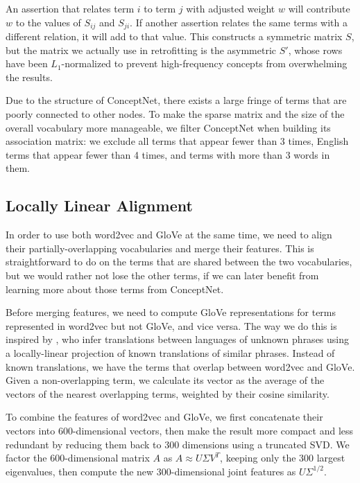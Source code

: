\documentclass[11pt,letterpaper]{article}
\begin{document}
An assertion that relates term $i$ to term $j$ with adjusted weight $w$ will
contribute $w$ to the values of $S_{ij}$ and $S_{ji}$. If another assertion
relates the same terms with a different relation, it will add to that value.
This constructs a symmetric matrix $S$, but the matrix we actually use in
retrofitting is the asymmetric $S'$, whose rows have been $L_1$-normalized to
prevent high-frequency concepts from overwhelming the results.

Due to the structure of ConceptNet, there exists a large fringe of terms that are
poorly connected to other nodes. To make the sparse matrix and the size of the
overall vocabulary more manageable, we filter ConceptNet when building its
association matrix: we exclude all terms that appear fewer than 3 times, English
terms that appear fewer than 4 times, and terms with more than 3 words in them.

\subsection{Locally Linear Alignment}
\label{locally-linear-alignment}

In order to use both word2vec and GloVe at the same time, we need to align their
partially-overlapping vocabularies and merge their features. This is
straightforward to do on the terms that are shared between the two vocabularies,
but we would rather not lose the other terms, if we can later benefit from
learning more about those terms from ConceptNet.

Before merging features, we need to compute GloVe representations for terms
represented in word2vec but not GloVe, and vice versa. The way we do this
is inspired by , who infer translations between
languages of unknown phrases using a locally-linear projection of known
translations of similar phrases. Instead of known translations, we have the
terms that overlap between word2vec and GloVe. Given a non-overlapping term,
we calculate its vector as the average of the vectors of the nearest
overlapping terms, weighted by their cosine similarity.

To combine the features of word2vec and GloVe, we first concatenate their
vectors into 600-dimensional vectors, then make the result more compact and
less redundant by reducing them back to 300 dimensions using a truncated SVD.
We factor the 600-dimensional matrix $A$ as $A \approx U \Sigma V^T$, keeping
only the 300 largest eigenvalues, then compute the new 300-dimensional joint
features as $U \Sigma^{1/2}$.
\end{document}
